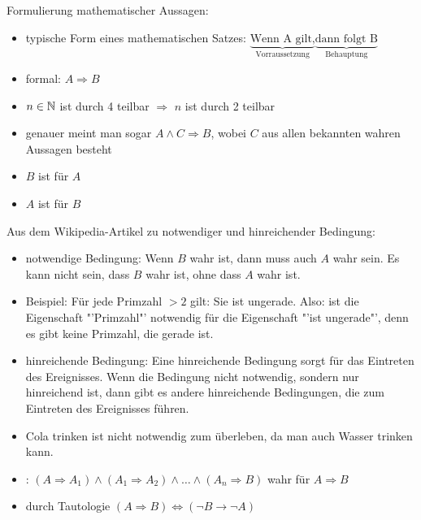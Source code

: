 Formulierung mathematischer Aussagen:
\begin{itemize}
	\item typische Form eines mathematischen Satzes: $\underbrace{\text{Wenn A gilt,}}_\text{Vorraussetzung}\underbrace{\text{dann folgt B}}_\text{Behauptung}$
	\item formal: $A\Rightarrow B$
\end{itemize}

\begin{example}
	\begin{itemize}
		\item $n\in\mathbb{N}$ ist durch 4 teilbar $\Rightarrow$ $n$ ist durch 2 teilbar
		\item genauer meint man sogar $A\land C\Rightarrow B$, wobei $C$ aus allen bekannten 
		wahren Aussagen besteht
		\item $B$ ist  für $A$
		\item $A$ ist  für $B$
	\end{itemize}
\end{example}

\begin{*anmerkung}
	Aus dem Wikipedia-Artikel zu notwendiger und hinreichender Bedingung:
	\begin{itemize}
		\item notwendige Bedingung: Wenn $B$ wahr ist, dann muss auch $A$ wahr sein. Es kann nicht sein, dass $B$ wahr ist, ohne dass $A$ wahr ist. 
		\item Beispiel: Für jede Primzahl $>2$ gilt: Sie ist ungerade. Also: ist die Eigenschaft "'Primzahl"' 
		notwendig für die Eigenschaft "'ist ungerade"', denn es gibt keine Primzahl, die gerade ist.
		\item hinreichende Bedingung: Eine hinreichende Bedingung sorgt für das Eintreten des Ereignisses. Wenn die Bedingung nicht notwendig, sondern nur hinreichend ist, dann gibt es andere hinreichende Bedingungen, die zum Eintreten des Ereignisses führen.
		\item Cola trinken ist nicht notwendig zum überleben, da man auch Wasser trinken kann.
	\end{itemize}
\end{*anmerkung}

\begin{definition}
	\begin{itemize}
		\item {}: $(A\Rightarrow A_1)\land(A_1\Rightarrow A_2)\land\dotsc\land(A_n\Rightarrow B)$ wahr für $A\Rightarrow B$
		\item {} durch Tautologie $(A\Rightarrow B)\Leftrightarrow (\neg B\rightarrow \neg A)$
	\end{itemize}
\end{definition}

